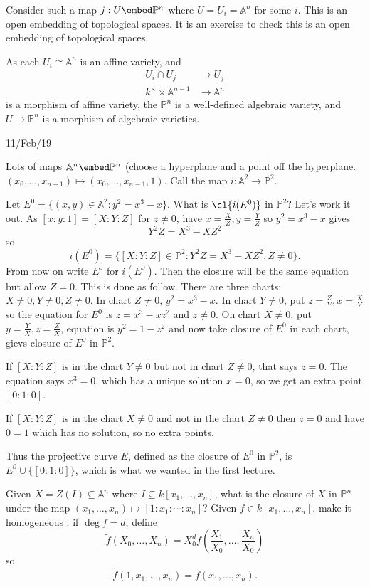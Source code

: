 \documentclass[a4paper]{article}
\renewcommand{\A}{\mathbb{A}}
\renewcommand*{\P}{\mathbb{P}}
\begin{document}
Consider such a map \(j: U \embed \P^n\) where \(U = U_i = \A^n\) for some \(i\). This is an open embedding of topological spaces. It is an exercise to check this is an open embedding of topological spaces.

As each \(U_i \cong \A^n\) is an affine variety, and
\begin{align*}
  U_i \cap U_j &\to U_j \\
  k^\times \times \A^{n - 1} &\to \A^n
\end{align*}
is a morphism of affine variety, the \(\P^n\) is a well-defined algebraic variety, and \(U \to \P^n\) is a morphism of algebraic varieties.

11/Feb/19

Lots of maps \(\A^n \embed \P^n\) (choose a hyperplane and a point off the hyperplane. \((x_0, \dots, x_{n -1}) \mapsto (x_0, \dots, x_{n - 1}, 1)\). Call the map \(i: \A^2 \to \P^2\).

Let \(E^0 = \{(x, y) \in \A^2: y^2 = x^3 - x\}\). What is \(\cl{i(E^0)}\) in \(\P^2\)? Let's work it out. As \([x: y: 1] = [X: Y: Z]\) for \(z \neq 0\), have \(x = \frac{X}{Z}, y = \frac{Y}{Z}\) so \(y^2 = x^3 - x\) gives
\[
  Y^2Z = X^3 - XZ^2
\]
so
\[
  i(E^0) = \{[X: Y: Z] \in \P^2: Y^2Z = X^3 - XZ^2, Z \neq 0\}.
\]
From now on write \(E^0\) for \(i(E^0)\). Then the closure will be the same equation but allow \(Z = 0\). This is done as follow. There are three charts: \(X \neq 0, Y \neq 0, Z \neq 0\). In chart \(Z \neq 0\), \(y^2 = x^3 - x\). In chart \(Y \neq 0\), put \(z = \frac{Z}{Y}, x = \frac{X}{Y}\) so the equation for \(E^0\) is \(z = x^3 - xz^2\) and \(z \neq 0\). On chart \(X \neq 0\), put \(y = \frac{Y}{X}, z = \frac{Z}{X}\), equation is \(y^2 = 1 - z^2\) and now take closure of \(E^0\) in each chart, gievs closure of \(E^0\) in \(\P^2\).

If \([X: Y: Z]\) is in the chart \(Y \neq 0\) but not in chart \(Z \neq 0\), that says \(z = 0\). The equation says \(x^3 = 0\), which has a unique solution \(x = 0\), so we get an extra point \([0: 1: 0]\).

If \([X: Y: Z]\) is  in the chart \(X \neq 0\) and not in the chart \(Z \neq 0\) then \(z = 0\) and have \(0 = 1\) which has no solution, so no extra points.

Thus the projective curve \(E\), defined as the closure of \(E^0\) in \(\P^2\), is \(E^0 \cup \{[0: 1: 0]\}\), which is what we wanted in the first lecture.

Given \(X = Z(I) \subseteq \A^n\) where \(I \subseteq k[x_1, \dots, x_n]\), what is the closure of \(X\) in \(\P^n\) under the map \((x_1, \dots, x_n) \mapsto [1: x_1: \cdots : x_n]\)? Given \(f \in k[x_1, \dots, x_n]\), make it homogeneous : if \(\deg f = d\), define
\[
  \tilde f(X_0, \dots, X_n) = X_0^d f(\frac{X_1}{X_0}, \dots, \frac{X_n}{X_0})
\]
so
\[
  \tilde f(1, x_1, \dots, x_n) = f(x_1, \dots, x_n).
\]
\end{document}
